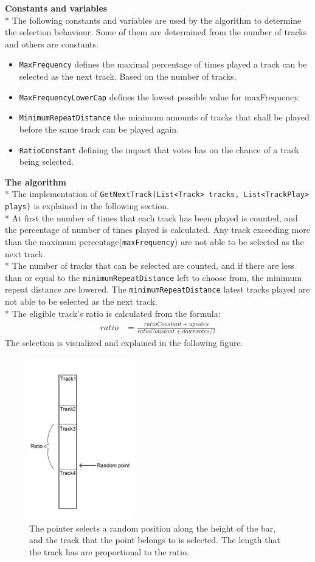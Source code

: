 \documentclass[a4paper,11pt,report]{article}
\begin{document}
\textbf{Constants and variables} \\*
The following constants and variables are used by the algorithm to determine the selection behaviour. Some of them are determined from the number of tracks and others are constants.
\begin{itemize}
\item \texttt{MaxFrequency} defines the maximal percentage of times played a track can be selected as the next track. Based on the number of tracks.
\item \texttt{MaxFrequencyLowerCap} defines the lowest possible value for maxFrequency.
\item \texttt{MinimumRepeatDistance} the minimum amounts of tracks that shall be played before the same track can be played again.
\item \texttt{RatioConstant} defining the impact that votes has on the chance of a track being selected.
\end{itemize}
\textbf{The algorithm} \\*
The implementation of \texttt{GetNextTrack(List<Track> tracks, List<TrackPlay> plays)} is explained in the following section. \\*
At first the number of times that each track has been played is counted, and the percentage of number of times played is calculated. Any track exceeding more than the maximum percentage(\texttt{maxFrequency}) are not able to be selected as the next track. \\*
The number of tracks that can be selected are counted, and if there are less than or equal to the \texttt{minimumRepeatDistance} left to choose from, the minimum repeat distance are lowered. The \texttt{minimumRepeatDistance} latest tracks played are not able to be selected as the next track.  \\*
The eligible track's ratio is calculated from the formula:
\begin{align*}
ratio &= \frac{ratioConstant + upvotes}{ratioConstant + downvotes/2}
\end{align*}
The selection is visualized and explained in the following figure.\\
\begin{figure}[htp]
\centering
\includegraphics[width=130pt,height=200pt,keepaspectratio=true]{./trackSelectionB.png}
\caption{The pointer selects a random position along the height of the bar, and the track that the point belongs to is selected. The length that the track has are proportional to the ratio.}
\end{figure}
\end{document}
